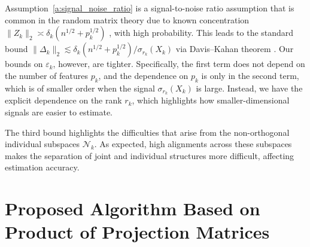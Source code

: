 \documentclass{amsart}
\begin{document}
{Assumption~\ref{a:signal_noise_ratio} is a signal-to-noise ratio assumption that is common in the random matrix theory due to known concentration $\|Z_k\|_2  \asymp\delta_k(n^{1/2}+p_k^{1/2})$ \citep{vershyninHighDimensionalProbabilityIntroduction2025}, with high probability. This leads to the standard bound $\|\Delta_k\|_2 \lesssim  \delta_k(n^{1/2} + p_k^{1/2})/\sigma_{r_k}(X_k)$ via Davis–Kahan theorem \citep{Davis1970TheRO}. Our bounds on $\varepsilon_k$, however, are tighter. %
Specifically, the first term does not depend on the number of features $p_k$, and the dependence on $p_k$ is only in the second term, which is of smaller order when the signal $\sigma_{r_k}(X_k)$ is large. Instead, we have the explicit dependence on the rank $r_k$, which highlights how smaller-dimensional signals are easier to estimate.


The third bound highlights the difficulties that arise from the non-orthogonal individual subspaces $\mathcal{N}_k$. As expected,  high alignments across these subspaces makes the separation of joint and individual structures more difficult, affecting estimation accuracy.

}

\section{{Proposed Algorithm Based on Product of Projection Matrices}}\label{sec:estimation}
\end{document}

